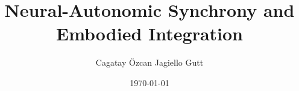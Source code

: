 \documentclass[12pt, a4paper]{article}
\title{Neural-Autonomic Synchrony and Embodied Integration}
\author{Cagatay Özcan Jagiello Gutt}
\date{\today}
\begin{document}
{\bfseries\maketitle}
\thispagestyle{fancy}
\vspace{-2\baselineskip}

\begin{abstract}
\end{abstract}
    
\end{document}
